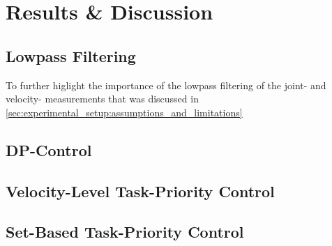 \chapter{Results \& Discussion}

\section{Lowpass Filtering}
\label{sec:results:lowpass_filtering}

To further higlight the importance of the lowpass filtering of the joint- and
velocity- measurements that was discussed in
\autoref{sec:experimental_setup:assumptions_and_limitations}

\section{DP-Control}

\section{Velocity-Level Task-Priority Control}

\section{Set-Based Task-Priority Control}
